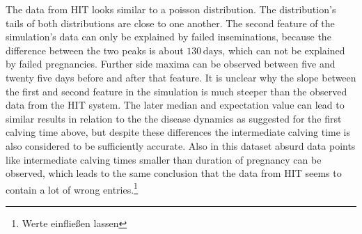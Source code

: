 The data from HIT looks similar to a poisson distribution. The distribution's tails of both distributions are close to one another. The second feature of the simulation's data can only be explained by failed inseminations, because the difference between the two peaks is about $130\,\text{days}$, which can not be explained by failed pregnancies. Further side maxima can be observed between five and twenty five days before and after that feature. It is unclear why the slope between the first and second feature in the simulation is much steeper than the observed data from the HIT system. The later median and expectation value can lead to similar results in relation to the the disease dynamics as suggested for the first calving time above, but despite these differences the intermediate calving time is also considered to be sufficiently accurate. Also in this dataset absurd data points like intermediate calving times smaller than duration of pregnancy can be observed, which leads to the same conclusion that the data from HIT seems to contain a lot of wrong entries.\footnote{Werte einfließen lassen}

